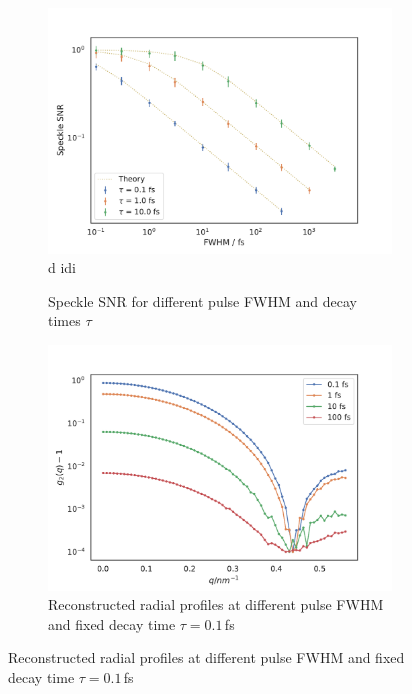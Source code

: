 \begin{figure}
	\begin{subfigure}[b]{0.45\textwidth}
		\includegraphics[width=\linewidth]{images/timedependent_1.pdf}
d idi		\caption{Speckle SNR for different pulse FWHM and decay times $\tau$}
	\end{subfigure}
	\begin{subfigure}[b]{0.45\textwidth}
		\includegraphics[width=\linewidth]{images/tdsphere.pdf}
		\caption{Reconstructed radial profiles at different pulse FWHM and fixed decay time $\tau = 0.1$\,fs}
	\end{subfigure}


\end{figure}
